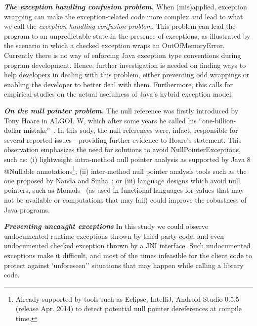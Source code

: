 \documentclass[conference]{IEEEtran}
\begin{document}
\emph{\textbf{The exception handling confusion problem.}}
When (mis)applied, exception wrapping can make the exception-related code
 more complex and lead to what we call the \emph{exception handling confusion problem}.
This problem can lead the program to an unpredictable state in the presence of exceptions,
as illustrated by the scenario in which a checked exception wraps an OutOfMemoryError. 
Currently there is no way of enforcing Java exception type conventions during program development.
Hence, further investigation is needed on finding ways to help developers in dealing with this
 problem, either preventing odd wrappings or enabling the developer to
 better deal with them.
Furthermore, this calls for empirical studies on the actual usefulness of Java's hybrid exception model. 


\emph{\textbf{On the null pointer problem.}}
The null reference was firstly introduced by Tony Hoare in ALGOL W, which after some years he called his ``one-billion-dollar mistake''~\cite{hoare2}.
In this sudy, the null references were, infact, responsible for several reported issues - providing further evidence to Hoare's statement.
This observation emphasizes the need for solutions to avoid NullPointerExceptions, such as:
(i) lightweight intra-method null pointer analysis as supported by
Java 8 @Nullable annotations\footnote{Already supported by tools such as Eclipse, IntelliJ, Android Studio 0.5.5 (release Apr. 2014) to detect potential 
null pointer dereferences at compile time.};
(ii) inter-method null pointer analysis tools such as the one proposed by Nanda and Sinha~\cite{nanda2009accurate};
or (iii) language designs which avoid null pointers, such 
as Monads~\cite{Walde95} (as used in functional languages for values that may not be available 
or computations that may fail) could improve the robustness of Java programs. 

\emph{\textbf{Preventing uncaught exceptions}}
In this study we could observe undocumented runtime exceptions thrown by third party code,
and even undocumented checked exception thrown by a JNI interface.
Such undocumented exceptions make it difficult, and most of the times infeasible
for the client code to protect against `unforeseen'' situations that may happen 
while calling a library code. 
\end{document}
